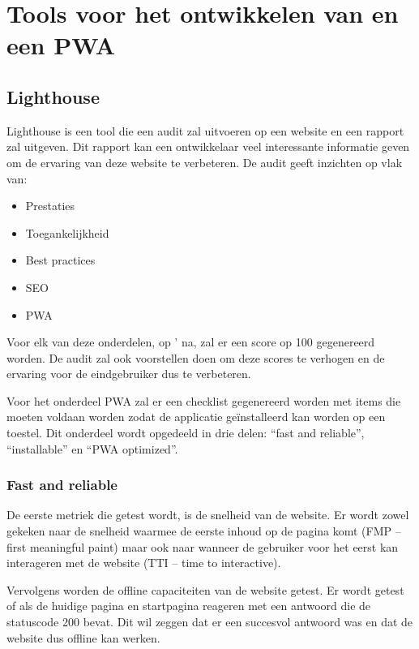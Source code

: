\section{Tools voor het ontwikkelen van en een PWA}


\subsection{Lighthouse}

	Lighthouse is een tool die een audit zal uitvoeren op een website en een rapport zal uitgeven. Dit rapport kan een ontwikkelaar veel interessante informatie geven om de ervaring van deze website te verbeteren. De audit geeft inzichten op vlak van:
	
	\begin{itemize}
		\item	Prestaties
		\item	Toegankelijkheid
		\item	Best practices
		\item	SEO
		\item   PWA
	\end{itemize}
	
	\autocite{Lighthouse2020}
	
	Voor elk van deze onderdelen, op ' na, zal er een score op 100 gegenereerd worden. De audit zal ook voorstellen doen om deze scores te verhogen en de ervaring voor de eindgebruiker dus te verbeteren.
	
	Voor het onderdeel PWA zal er een checklist gegenereerd worden met items die moeten voldaan worden zodat de applicatie geïnstalleerd kan worden op een toestel. Dit onderdeel wordt opgedeeld in drie delen: “fast and reliable”, “installable” en “PWA optimized”.
	
	
	\subsubsection{Fast and reliable}
		De eerste metriek die getest wordt, is de snelheid van de website. Er wordt zowel gekeken naar de snelheid waarmee de eerste inhoud op de pagina komt (FMP – first meaningful paint) maar ook naar wanneer de gebruiker voor het eerst kan interageren met de website (TTI – time to interactive).
		
		\autocite{web.dev2020}
		
		Vervolgens worden de offline capaciteiten van de website getest. Er wordt getest of als de huidige pagina en startpagina reageren met een antwoord die de statuscode 200 bevat. Dit wil zeggen dat er een succesvol antwoord was en dat de website dus offline kan werken.
	
